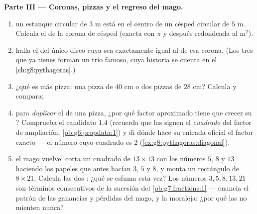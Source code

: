\begin{problem}[{Problema de fin de semana --- una «demostración» famosa de que
$64 = 65$, desenmascarada con áreas y pendientes, con pizzas y coronas de
postre}]
\medskip
\noindent\textbf{Parte III --- Coronas, pizzas y el regreso del
mago.}
\begin{enumerate}[resume]
  \item un estanque circular de  $3$ m está en el centro de un
        césped circular de  $5$ m. Calcula el  de la
        corona de césped (exacta con $\pi$ y después redondeada al
        m$^2$).
  \item halla el  del único disco cuya  sea exactamente
        igual al  de esa corona. (Los tres  que ya tienes
        forman un trío famoso, cuya historia se cuenta en el
        \cref{ch:g8:pythagoras}.)
  \item ¿qué es más pizza: una pizza de  $40$ cm o
        dos pizzas de  $28$ cm? Calcula y compara;
  \item para \emph{duplicar} el  de una pizza, ¿por qué factor
        aproximado tiene que crecer su ? Comprueba el candidato $1.4$ (recuerda
        que las  siguen el \emph{cuadrado} del factor de
        ampliación, \cref{pb:g6:propdata:1}) y di dónde hace su
        entrada oficial el factor exacto --- el número cuyo cuadrado es $2$
        (\cref{ex:g8:pythagoras:diagonal}).
  \item el mago vuelve: corta un cuadrado de $13 \times 13$
        con los números $5$, $8$ y $13$ haciendo los papeles que
        antes hacían $3$, $5$ y $8$, y monta un
        rectángulo de $8 \times 21$. Calcula las dos : ¿qué
        se esfuma esta vez? Los números $3, 5, 8, 13, 21$ son
        términos consecutivos de la sucesión del
        \cref{pb:g7:fractions:1} --- enuncia el patrón de las
        ganancias y pérdidas del mago, y la moraleja: ¿por qué las 
        no mienten nunca?
\end{enumerate}
\end{problem}

